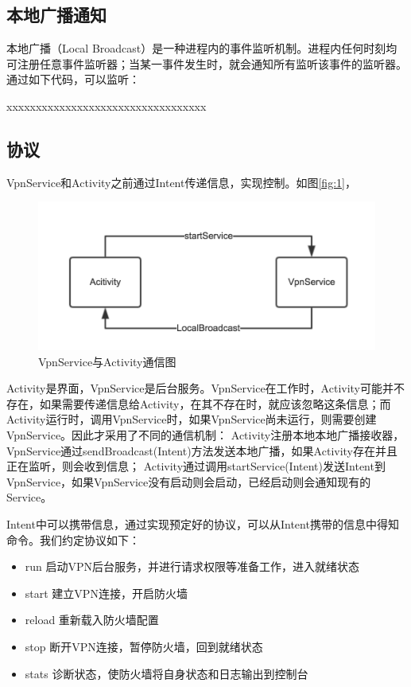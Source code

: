 \documentclass[format=final, language=chinese, degree=fyp]{hustthesis}
\begin{document}
\subsection{本地广播通知}

本地广播（Local Broadcast）是一种进程内的事件监听机制。进程内任何时刻均可注册任意事件监听器；当某一事件发生时，就会通知所有监听该事件的监听器。通过如下代码，可以监听：


    xxxxxxxxxxxxxxxxxxxxxxxxxxxxxxxxxx


\subsection{协议}

VpnService和Activity之前通过Intent传递信息，实现控制。如图\autoref{fig:1}，

\begin{figure}[h!]
\centering
\includegraphics[width=.8\textwidth]{image_intent_commuciate.png}
\caption{VpnService与Activity通信图}\label{fig:1}
\end{figure}

Activity是界面，VpnService是后台服务。VpnService在工作时，Activity可能并不存在，如果需要传递信息给Activity，在其不存在时，就应该忽略这条信息；而Activity运行时，调用VpnService时，如果VpnService尚未运行，则需要创建VpnService。因此才采用了不同的通信机制：
Activity注册本地本地广播接收器，VpnService通过sendBroadcast(Intent)方法发送本地广播，如果Activity存在并且正在监听，则会收到信息；
Activity通过调用startService(Intent)发送Intent到VpnService，如果VpnService没有启动则会启动，已经启动则会通知现有的Service。

Intent中可以携带信息，通过实现预定好的协议，可以从Intent携带的信息中得知命令。我们约定协议如下：
\begin{itemize}
    \item run     启动VPN后台服务，并进行请求权限等准备工作，进入就绪状态
    \item start   建立VPN连接，开启防火墙
    \item reload  重新载入防火墙配置
    \item stop    断开VPN连接，暂停防火墙，回到就绪状态
    \item stats   诊断状态，使防火墙将自身状态和日志输出到控制台
\end{itemize}
\end{document}
